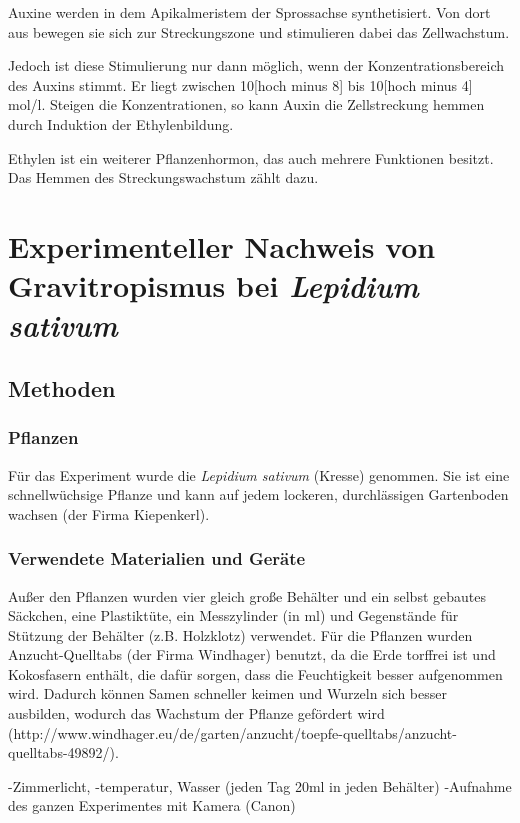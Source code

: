 \documentclass[
a4paper, 
11pt, 
ngerman,
listof=totoc,
bibliography=totocnumbered,
abstracton
]{scrreprt}
\begin{document}
Auxine werden in dem Apikalmeristem der Sprossachse synthetisiert. Von dort aus bewegen sie sich zur Streckungszone und stimulieren dabei das Zellwachstum.

Jedoch ist diese Stimulierung nur dann möglich, wenn der Konzentrationsbereich des Auxins stimmt. Er liegt zwischen 10[hoch minus 8] bis 10[hoch minus 4] mol/l. Steigen die Konzentrationen, so kann Auxin die Zellstreckung hemmen durch Induktion der Ethylenbildung.

Ethylen ist ein weiterer Pflanzenhormon, das auch mehrere Funktionen besitzt. Das Hemmen des Streckungswachstum zählt dazu. 


\chapter{Experimenteller Nachweis von Gravitropismus bei \emph{Lepidium sativum}}

\section{Methoden}

\subsection{Pflanzen}

Für das Experiment wurde die \emph{Lepidium sativum} (Kresse) genommen. Sie ist eine schnellwüchsige Pflanze und kann auf jedem lockeren, durchlässigen Gartenboden wachsen (der Firma Kiepenkerl).



\subsection{Verwendete Materialien und Geräte}
Außer den Pflanzen wurden vier gleich große Behälter und ein selbst gebautes Säckchen, eine Plastiktüte, ein Messzylinder (in ml) und Gegenstände für Stützung der Behälter (z.B. Holzklotz) verwendet. Für die Pflanzen wurden Anzucht-Quelltabs (der Firma Windhager) benutzt, da die Erde torffrei ist und Kokosfasern enthält, die dafür sorgen, dass die Feuchtigkeit besser aufgenommen wird. Dadurch können Samen schneller keimen und Wurzeln sich besser ausbilden, wodurch das Wachstum der Pflanze gefördert wird (http://www.windhager.eu/de/garten/anzucht/toepfe-quelltabs/anzucht-quelltabs-49892/). 

-Zimmerlicht, -temperatur, Wasser (jeden Tag 20ml in jeden Behälter)
-Aufnahme des ganzen Experimentes mit Kamera (Canon)
\end{document}
